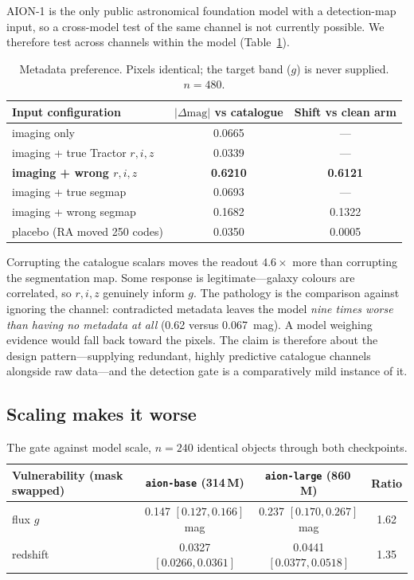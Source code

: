 \documentclass[11pt]{article}
\newcommand{\aion}{AION-1}
\newcommand{\dmag}{|\Delta\mathrm{mag}|}
\begin{document}
\aion{} is the only public astronomical foundation model with a detection-map input, so a
cross-model test of the same channel is not currently possible. We therefore test across
channels within the model (Table~\ref{tab:meta}).

\begin{table}[t]
\centering\small
\caption{Metadata preference. Pixels identical; the target band ($g$) is never supplied.
$n=480$.}
\label{tab:meta}
\begin{tabular}{lcc}
\toprule
Input configuration & $\dmag$ vs catalogue & Shift vs clean arm \\
\midrule
imaging only                        & 0.0665 & --- \\
imaging + true Tractor $r,i,z$      & 0.0339 & --- \\
\textbf{imaging + wrong $r,i,z$}    & \textbf{0.6210} & \textbf{0.6121} \\
imaging + true segmap               & 0.0693 & --- \\
imaging + wrong segmap              & 0.1682 & 0.1322 \\
placebo (RA moved 250 codes)        & 0.0350 & 0.0005 \\
\bottomrule
\end{tabular}
\end{table}

Corrupting the catalogue scalars moves the readout $4.6\times$ more than corrupting the
segmentation map. Some response is legitimate---galaxy colours are correlated, so $r,i,z$
genuinely inform $g$. The pathology is the comparison against ignoring the channel:
contradicted metadata leaves the model \emph{nine times worse than having no metadata at all}
(0.62 versus \SI{0.067}{mag}). A model weighing evidence would fall back toward the pixels. The
claim is therefore about the design pattern---supplying redundant, highly predictive catalogue
channels alongside raw data---and the detection gate is a comparatively mild instance of it.

\subsection{Scaling makes it worse}

\begin{table}[H]
\centering\small
\caption{The gate against model scale, $n=240$ identical objects through both checkpoints.}
\label{tab:scale}
\begin{tabular}{lccc}
\toprule
Vulnerability (mask swapped) & \texttt{aion-base} (\num{314}\,M) & \texttt{aion-large} (\num{860}\,M) & Ratio \\
\midrule
flux $g$  & 0.147 $[0.127,0.166]$ mag & 0.237 $[0.170,0.267]$ mag & 1.62 \\
redshift  & 0.0327 $[0.0266,0.0361]$  & 0.0441 $[0.0377,0.0518]$  & 1.35 \\
\bottomrule
\end{tabular}
\end{table}
\end{document}
